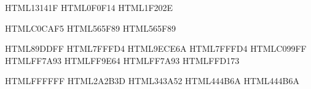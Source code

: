 \definecolor{tnBg}        {HTML}{13141F}   %
\definecolor{tnBgDark}    {HTML}{0F0F14}   %
\definecolor{tnBgHL}      {HTML}{1F202E}   %

\definecolor{tnFg}        {HTML}{C0CAF5}   %
\definecolor{tnFgDark}    {HTML}{565F89}   %
\definecolor{tnComment}   {HTML}{565F89}   %

\definecolor{tnBlue}      {HTML}{89DDFF}   %
\definecolor{tnCyan}      {HTML}{7FFFD4}   %
\definecolor{tnGreen}     {HTML}{9ECE6A}   %
\definecolor{tnTeal}      {HTML}{7FFFD4}   %
\definecolor{tnPurple}    {HTML}{C099FF}   %
\definecolor{tnMagenta}   {HTML}{FF7A93}   %
\definecolor{tnOrange}    {HTML}{FF9E64}   %
\definecolor{tnRed}       {HTML}{FF7A93}   %
\definecolor{tnYellow}    {HTML}{FFD173}   %

\definecolor{tnWhite}     {HTML}{FFFFFF}   %
\definecolor{tnSurface0}  {HTML}{2A2B3D}   %
\definecolor{tnSurface1}  {HTML}{343A52}   %
\definecolor{tnOverlay0}  {HTML}{444B6A}   %
\definecolor{tnOverlay2}  {HTML}{444B6A}   %
